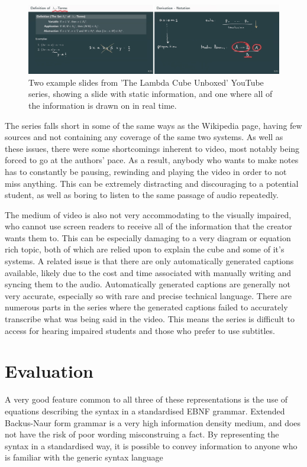 \documentclass{l4proj}
\begin{document}
\begin{figure}[h!]
    \centering
    \includegraphics[width=1.0\linewidth]{dissertation/images/unboxed_merged.png}
    \caption{Two example slides from 'The Lambda Cube Unboxed' YouTube series, showing a slide with static information, and one where all of the information is drawn on in real time.}
    \label{fig:enter-label}
\end{figure}

The series falls short in some of the same ways as the Wikipedia page, having few sources and not containing any coverage of the same two systems.  As well as these issues, there were some shortcomings inherent to video, most notably being forced to go at the authors' pace.  As a result, anybody who wants to make notes has to constantly be pausing, rewinding and playing the video in order to not miss anything.  This can be extremely distracting and discouraging to a potential student, as well as boring to listen to the same passage of audio repeatedly.

The medium of video is also not very accommodating to the visually impaired, who cannot use screen readers to receive all of the information that the creator wants them to.  This can be especially damaging to a very diagram or equation rich topic, both of which are relied upon to explain the cube and some of it's systems.  A related issue is that there are only automatically generated captions available, likely due to the cost and time associated with manually writing and syncing them to the audio.  Automatically generated captions are generally not very accurate, especially so with rare and precise technical language.  There are numerous parts in the series where the generated captions failed to accurately transcribe what was being said in the video.  This means the series is difficult to access for hearing impaired students and those who prefer to use subtitles.

\section{Evaluation}

A very good feature common to all three of these representations is the use of equations describing the syntax in a standardised EBNF grammar.  Extended Backus-Naur form grammar is a very high information density medium, and does not have the risk of poor wording misconstruing a fact.  By representing the syntax in a standardised way, it is possible to convey information to anyone who is familiar with the generic syntax language
\end{document}
